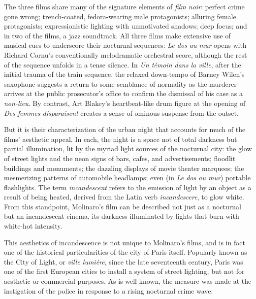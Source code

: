 \documentclass[
  letterpaper,
  DIV=11,
  numbers=noendperiod,
  oneside]{scrartcl}
\begin{document}
The three films share many of the signature elements of \emph{film
noir}: perfect crime gone wrong; trench-coated, fedora-wearing male
protagonists; alluring female protagonists; expressionistic lighting
with unmotivated shadows; deep focus; and in two of the films, a jazz
soundtrack. All three films make extensive use of musical cues to
underscore their nocturnal sequences: \emph{Le dos au mur} opens with
Richard Cornu's conventionally melodramatic orchestral score, although
the rest of the sequence unfolds in a tense silence. In \emph{Un témoin
dans la ville}, after the initial trauma of the train sequence, the
relaxed down-tempo of Barney Wilen's saxophone suggests a return to some
semblance of normality as the murderer arrives at the public
prosecutor's office to confirm the dismissal of his case as a
\emph{non-lieu}. By contrast, Art Blakey's heartbeat-like drum figure at
the opening of \emph{Des femmes disparaisent} creates a sense of ominous
suspense from the outset.

But it is their characterization of the urban night that accounts for
much of the films' aesthetic appeal. In each, the night is a space not
of total darkness but partial illumination, lit by the myriad light
sources of the nocturnal city: the glow of street lights and the neon
signs of bars, cafes, and advertisements; floodlit buildings and
monuments; the dazzling displays of movie theater marquees; the
mesmerizing patterns of automobile headlamps; even (in \emph{Le dos au
mur}) portable flashlights. The term \emph{incandescent} refers to the
emission of light by an object as a result of being heated, derived from
the Latin verb \emph{incandescere}, to glow white. From this standpoint,
Molinaro's film can be described not just as a nocturnal but an
incandescent cinema, its darkness illuminated by lights that burn with
white-hot intensity.

\marginnote{\begin{footnotesize}

\end{footnotesize}}

This aesthetics of incandescence is not unique to Molinaro's films, and
is in fact one of the historical particularities of the city of Paris
itself. Popularly known as the City of Light, or \emph{ville lumière},
since the late seventeenth century, Paris was one of the first European
cities to install a system of street lighting, but not for aesthetic or
commercial purposes. As is well known, the measure was made at the
instigation of the police in response to a rising nocturnal crime wave:
\end{document}
